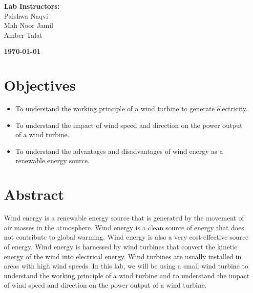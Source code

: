 \documentclass[a4paper, 12pt, english]{article}
\begin{document}
\begin{titlepage}
\begin{center}
		\vspace{45pt}
		\textbf {\large Lab Instructors:}\\[0.2cm]
		\Large {Paishwa Naqvi}\\[0.1cm]
		\Large {Mah Noor Jamil}\\[0.1cm]
		\Large {Amber Talat}\\[0.1cm]
	\end{center}

	\par
	\vfill
	\begin{center}
		\textbf{\today}\\
	\end{center}

\end{titlepage}



\newpage
\section{Objectives}
\begin{itemize}
	\item To understand the working principle of a wind turbine to generate electricity.
	\item To understand the impact of wind speed and direction on the power output of a
	      wind turbine.
	\item To understand the advantages and disadvantages of wind energy as a renewable
	      energy source.
\end{itemize}

\section{Abstract}
Wind energy is a renewable energy source that is generated by the movement of
air masses in the atmosphere. Wind energy is a clean source of energy that does
not contribute to global warming. Wind energy is also a very cost-effective
source of energy. Wind energy is harnessed by wind turbines that convert the
kinetic energy of the wind into electrical energy. Wind turbines are usually
installed in areas with high wind speeds. In this lab, we will be using a small
wind turbine to understand the working principle of a wind turbine and to
understand the impact of wind speed and direction on the power output of a wind
turbine.
\end{document}
